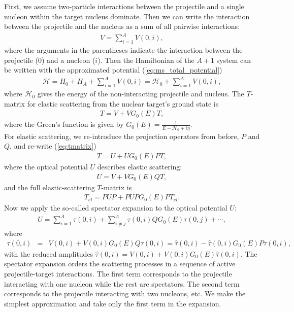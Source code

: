 \documentclass[preprintnumbers,floatfix,aps,prc,preprint,nofootinbib]{revtex4-1}
\begin{document}
First, we assume two-particle interactions between the projectile and a single nucleon within the target nucleus dominate. Then we can write the interaction between the projectile and the nucleus as a sum of all pairwise interactions:
%
\begin{eqnarray}
	\label{eq:ms_total_potential}
	V = \sum_{i=1}^A V(0, i),
\end{eqnarray}
%
where the arguments in the parentheses indicate the interaction between the projectile ($0$) and a nucleon ($i$). Then the Hamiltonian of the $A+1$ system can be written with the approximated potential (\ref{eq:ms_total_potential})
%
\begin{eqnarray}
	\label{eq:ms_hamiltonian}
	\mathcal{H} = H_0 + H_A + \sum_{i=1}^A V(0, i) = \mathcal{H}_0 + \sum_{i=1}^A V(0, i),
\end{eqnarray}
%
where $\mathcal{H}_0$ gives the energy of the non-interacting projectile and nucleus. The $T$-matrix for elastic scattering from the nuclear target's ground state is
%
\begin{eqnarray}
	\label{eq:tmatrix}
	T = V + V G_0(E) T,
\end{eqnarray}
%
where the Green's function is given by $G_0(E) = \frac{1}{E - \mathcal{H}_0 + i \eta}$.
\\

For elastic scattering, we re-introduce the projection operators from before, $P$ and $Q$, and re-write (\ref{eq:tmatrix})
%
\begin{eqnarray}
	\label{eq:tmatrix_elastic}
	T = U + U G_0(E) P T,
\end{eqnarray}
%
where the optical potential $U$ describes elastic scattering:
%
\begin{eqnarray}
	\label{eq:ms_optical_potential_elastic}
	U = V + V G_0(E) Q T,
\end{eqnarray}
%
and the full elastic-scattering $T$-matrix is
%
\begin{eqnarray}
	\label{eq:tmatrix_full_elastic}
	T_{el} = P U P + P U P G_0(E) P T_{el}.
\end{eqnarray}
%
Now we apply the so-called spectator expansion to the optical potential $U$:
%
\begin{eqnarray}
	\label{eqn:spec_exp}
	U = \sum_{i=1}^A \tau(0, i) + \sum_{i \neq j}^A \tau(0, i) Q G_0(E) \tau(0, j) + \cdots,
\end{eqnarray}
%
where
\begin{eqnarray}
	\label{eq:tau_equations}
	\tau(0, i) &=& V(0, i) + V(0, i) G_0(E) Q \tau(0, i) = \hat{\tau}(0, i) - \hat{\tau}(0, i) G_0(E) P \tau(0, i),
\end{eqnarray}
%
with the reduced amplitudes $\hat{\tau}(0, i) = V(0, i) + V(0, i) G_0(E) \hat{\tau}(0, i)$. The spectator expansion orders the scattering processes in a sequence of active projectile-target interactions. The first term corresponds to the projectile interacting with one nucleon while the rest are spectators. The second term corresponds to the projectile interacting with two nucleons, etc. We make the simplest approximation and take only the first term in the expansion.
\\
\end{document}
